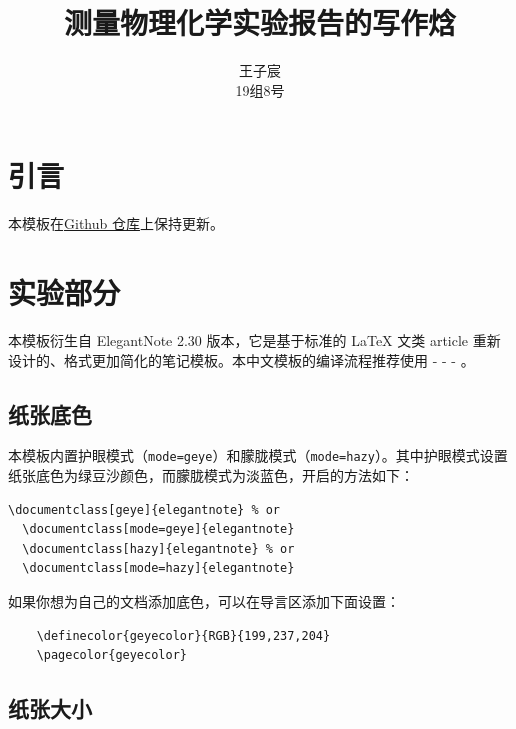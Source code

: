 \documentclass[cn,hazy,pku,12pt,normal,math=newtx,cite=super]{elegantnote}
\title{测量物理化学实验报告的写作焓}
\author{王子宸\quad210001873\\
19组\quad 8号}
\institute{化学与分子工程学院}
\begin{document}
\maketitle


\abstracts{

}

\newpage


\section{引言}

本模板在\href{https://github.com/Benzoin96485/PCLreport_elegant}{Github 仓库}上保持更新。

\section{实验部分}

本模板衍生自 ElegantNote 2.30 版本，它是基于标准的 \LaTeX{} 文类 article 重新设计的、格式更加简化的笔记模板。本中文模板的编译流程推荐使用  -  -  - 。

\subsection{纸张底色}

本模板内置护眼模式（\lstinline{mode=geye}）和朦胧模式（\lstinline{mode=hazy}）。其中护眼模式设置纸张底色为绿豆沙颜色，而朦胧模式为淡蓝色，开启的方法如下：
\begin{lstlisting}[frame=none]  
  \documentclass[geye]{elegantnote} % or
  \documentclass[mode=geye]{elegantnote}
  \documentclass[hazy]{elegantnote} % or
  \documentclass[mode=hazy]{elegantnote}
\end{lstlisting}

\begin{remark}
  如果你想为自己的文档添加底色，可以在导言区添加下面设置：
  \begin{lstlisting}
    \definecolor{geyecolor}{RGB}{199,237,204}
    \pagecolor{geyecolor}
  \end{lstlisting}
\end{remark}


\subsection{纸张大小}
\end{document}
